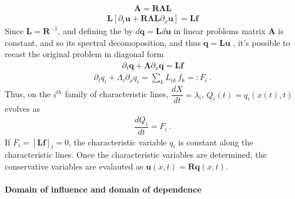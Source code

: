\documentclass[letterpaper,10pt,english]{jupyterBook}
\begin{document}
\sphinxAtStartPar
{}
\begin{equation*}
\begin{split}\mathbf{A} = \mathbf{R} \symbf{\Lambda} \mathbf{L}\end{split}
\end{equation*}\begin{equation*}
\begin{split}\mathbf{L} \left[ \partial_t \mathbf{u} + \mathbf{R} \symbf{\Lambda} \mathbf{L} \partial_x \mathbf{u} \right] = \mathbf{L} \mathbf{f} \end{split}
\end{equation*}
\sphinxAtStartPar
Since \(\mathbf{L} = \mathbf{R}^{-1}\), and defining the  by \(d \mathbf{q} = \mathbf{L} d \mathbf{u}\) \sphinxhyphen{} in linear problems matrix \(\mathbf{A}\) is constant, and so its spectral decomoposition, and thus \(\mathbf{q} = \mathbf{L} \mathbf{u}\) \sphinxhyphen{} , it’s possible to recast the original problem in diagonal form
\begin{equation*}
\begin{split}\partial_t \mathbf{q} + \symbf{\Lambda} \partial_x \mathbf{q} = \mathbf{L} \mathbf{f}\end{split}
\end{equation*}\begin{equation*}
\begin{split}\partial_t q_i + \Lambda_i \partial_x q_i = \sum_{k} L_{ik} \, f_k =: F_i \ .\end{split}
\end{equation*}
\sphinxAtStartPar
Thus, on the \(i^{th}\) family of characteristic lines, \(\dfrac{d X}{dt} = \lambda_i\), \(Q_i(t) = q_i(x(t), t)\) evolves as
\begin{equation*}
\begin{split}\dfrac{d Q_i}{d t} = F_i \ .\end{split}
\end{equation*}
\sphinxAtStartPar
If \(F_i = \left[ \mathbf{L} \mathbf{f} \right]_i = 0\), the characteristic variable \(q_i\) is constant along the characteristic lines. Once the characteristic variables are determined, the conservative variables are evalauted as \(\mathbf{u}(x,t) = \mathbf{R} \mathbf{q}(x,t)\).


\paragraph{Domain of influence and domain of dependence}
\label{\detokenize{ch/pde/hyperbolic-dimensions:domain-of-influence-and-domain-of-dependence}}
\end{document}

